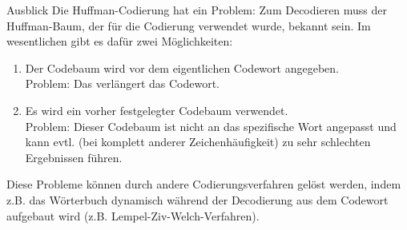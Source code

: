 \begin{frame}{Ausblick}
	Die Huffman-Codierung hat ein Problem: Zum Decodieren muss der Huffman-Baum, der für die Codierung verwendet wurde, bekannt sein. Im wesentlichen gibt es dafür zwei Möglichkeiten:
	\begin{enumerate}
		\item Der Codebaum wird vor dem eigentlichen Codewort angegeben.\\ 
		Problem: Das verlängert das Codewort.
		\item Es wird ein vorher festgelegter Codebaum verwendet.\\
		 Problem: Dieser Codebaum ist nicht an das spezifische Wort angepasst und kann evtl. (bei komplett anderer Zeichenhäufigkeit) zu sehr schlechten Ergebnissen führen.
	\end{enumerate}

	Diese Probleme können durch andere Codierungsverfahren gelöst werden, indem z.B. das Wörterbuch dynamisch während der Decodierung aus dem Codewort aufgebaut wird (z.B. Lempel-Ziv-Welch-Verfahren).
\end{frame}

